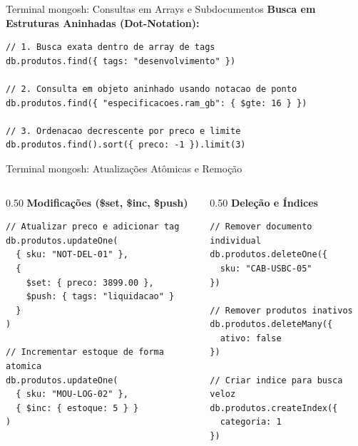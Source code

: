 \begin{frame}[fragile]{Terminal mongosh: Consultas em Arrays e Subdocumentos}
  \textbf{Busca em Estruturas Aninhadas (Dot-Notation):}
\begin{lstlisting}[basicstyle=\ttfamily\scriptsize]
// 1. Busca exata dentro de array de tags
db.produtos.find({ tags: "desenvolvimento" })

// 2. Consulta em objeto aninhado usando notacao de ponto
db.produtos.find({ "especificacoes.ram_gb": { $gte: 16 } })

// 3. Ordenacao decrescente por preco e limite
db.produtos.find().sort({ preco: -1 }).limit(3)
\end{lstlisting}
\end{frame}

\begin{frame}[fragile]{Terminal mongosh: Atualizações Atômicas e Remoção}
  \begin{columns}[T]
    \begin{column}{0.50\textwidth}
      \textbf{Modificações (\$set, \$inc, \$push)}
\begin{lstlisting}[basicstyle=\ttfamily\tiny]
// Atualizar preco e adicionar tag
db.produtos.updateOne(
  { sku: "NOT-DEL-01" },
  {
    $set: { preco: 3899.00 },
    $push: { tags: "liquidacao" }
  }
)

// Incrementar estoque de forma atomica
db.produtos.updateOne(
  { sku: "MOU-LOG-02" },
  { $inc: { estoque: 5 } }
)
\end{lstlisting}
    \end{column}

    \begin{column}{0.50\textwidth}
      \textbf{Deleção e Índices}
\begin{lstlisting}[basicstyle=\ttfamily\tiny]
// Remover documento individual
db.produtos.deleteOne({
  sku: "CAB-USBC-05"
})

// Remover produtos inativos
db.produtos.deleteMany({
  ativo: false
})

// Criar indice para busca veloz
db.produtos.createIndex({
  categoria: 1
})
\end{lstlisting}
    \end{column}
  \end{columns}
\end{frame}
